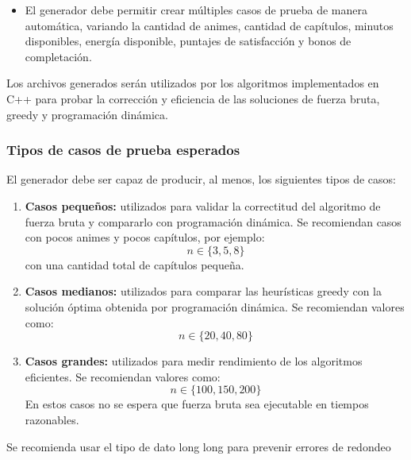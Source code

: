 \begin{itemize}
\begin{itemize}
        \item Luego, para cada uno de los $q_i$ capítulos del anime $i$, se entrega una línea con:
        \[
        t_{i,j} \ c_{i,j} \ v_{i,j}
        \]
        donde:
        \begin{itemize}
            \item $t_{i,j}$ es la duración del capítulo en minutos.
            \item $c_{i,j}$ es el costo de energía del capítulo.
            \item $v_{i,j}$ es la satisfacción obtenida al ver el capítulo.
        \end{itemize}
    \end{itemize}

    \item El generador debe permitir crear múltiples casos de prueba de manera automática, variando la cantidad de animes, cantidad de capítulos, minutos disponibles, energía disponible, puntajes de satisfacción y bonos de completación.
\end{itemize}

\begin{mdframed}
    Los archivos generados serán utilizados por los algoritmos implementados en C++ para probar la corrección y eficiencia de las soluciones de fuerza bruta, greedy y programación dinámica.
\end{mdframed}

\subsubsection{Tipos de casos de prueba esperados}

El generador debe ser capaz de producir, al menos, los siguientes tipos de casos:

\begin{enumerate}
    \item \textbf{Casos pequeños:} utilizados para validar la correctitud del algoritmo de fuerza bruta y compararlo con programación dinámica. Se recomiendan casos con pocos animes y pocos capítulos, por ejemplo:
    \[
        n \in \{3, 5, 8\}
    \]
    con una cantidad total de capítulos pequeña.

    \item \textbf{Casos medianos:} utilizados para comparar las heurísticas greedy con la solución óptima obtenida por programación dinámica. Se recomiendan valores como:
    \[
        n \in \{20, 40, 80\}
    \]

    \item \textbf{Casos grandes:} utilizados para medir rendimiento de los algoritmos eficientes. Se recomiendan valores como:
    \[
        n \in \{100, 150, 200\}
    \]
    En estos casos no se espera que fuerza bruta sea ejecutable en tiempos razonables.
\end{enumerate}
    Se recomienda usar el tipo de dato long long para prevenir errores de redondeo

